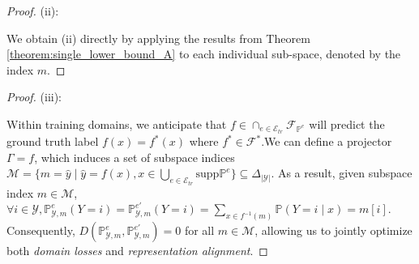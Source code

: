 \begin{proof}(ii):

We obtain (ii) directly by applying the results from Theorem \ref{theorem:single_lower_bound_A} to each individual sub-space, denoted by the index $m$.
\end{proof}

\begin{proof}(iii):

Within training domains, we anticipate that $f\in \cap_{e\in \mathcal{E}_{tr}}\mathcal{F}_{\mathbb{P}^{e}}$ will predict the ground truth label $f(x)=f^*(x)$ where $f^*\in \mathcal{F}^*$.We can define a projector \(\Gamma = f\), which induces a set of subspace indices $\mathcal{M}=\{m=\hat{y}\mid \hat{y}=f(x), x\in\bigcup_{e\in\mathcal{E}_{tr}}\text{supp}\mathbb{P}^{e} \}\subseteq \Delta_{\left | \mathcal{Y}\right |}$. As a result, given subspace index $m\in\mathcal{M}$, $\forall i \in \mathcal{Y}, \mathbb{P}^{e}_{\mathcal{Y},m}(Y=i) = \mathbb{P}^{e'}_{\mathcal{Y},m}(Y=i) = \sum_{x \in f^{-1}(m)}\mathbb{P}(Y=i\mid x) = m[i]$. Consequently, \(D\left(\mathbb{P}^{e}_{\mathcal{Y},m}, \mathbb{P}^{e'}_{\mathcal{Y},m}\right) = 0\) for all \(m \in \mathcal{M}\), allowing us to jointly optimize both \textit{domain losses} and \textit{representation alignment}.
\end{proof}

